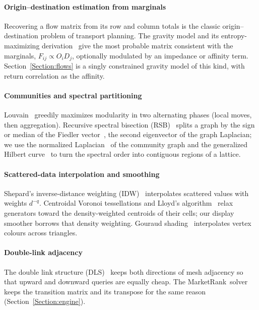 \documentclass[preprint,3p,twocolumn]{elsarticle}
\newcommand{\MR}{MarketRank}
\begin{document}
\paragraph{Origin--destination estimation from marginals} Recovering a flow matrix from its row and column totals is the classic origin--destination problem of transport planning. The gravity model and its entropy-maximizing derivation~\cite{wilson} give the most probable matrix consistent with the marginals, $F_{ij}\propto O_i D_j$, optionally modulated by an impedance or affinity term. Section~\ref{Section:flows} is a singly constrained gravity model of this kind, with return correlation as the affinity.

\paragraph{Communities and spectral partitioning} Louvain~\cite{louvain} greedily maximizes modularity in two alternating phases (local moves, then aggregation). Recursive spectral bisection (RSB)~\cite{rsb} splits a graph by the sign or median of the Fiedler vector~\cite{fiedler}, the second eigenvector of the graph Laplacian; we use the normalized Laplacian~\cite{chung} of the community graph and the generalized Hilbert curve~\cite{hilbert,gilbert} to turn the spectral order into contiguous regions of a lattice.

\paragraph{Scattered-data interpolation and smoothing} Shepard's inverse-distance weighting (IDW)~\cite{shepard} interpolates scattered values with weights $d^{-q}$. Centroidal Voronoi tessellations and Lloyd's algorithm~\cite{cvt,lloyd} relax generators toward the density-weighted centroids of their cells; our display smoother borrows that density weighting. Gouraud shading~\cite{gouraud} interpolates vertex colours across triangles.

\paragraph{Double-link adjacency} The double link structure (DLS)~\cite{dls} keeps both directions of mesh adjacency so that upward and downward queries are equally cheap. The \MR\ solver keeps the transition matrix and its transpose for the same reason (Section~\ref{Section:engine}).

\end{document}
